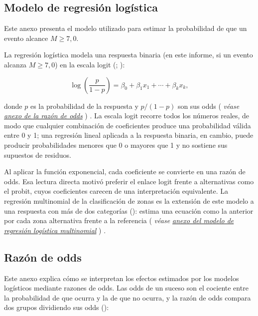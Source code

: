 \documentclass[
  spanish,
  letterpaper,
  DIV=11,
  numbers=noendperiod]{scrartcl}
\newcommand{\asesoriaParenRef}[1]{%
  \textnormal{\textcolor{asesoriaTextColor}{(}}%
  {\hypersetup{linkcolor=asesoriaLinkColor,urlcolor=asesoriaLinkColor,citecolor=asesoriaLinkColor}\textcolor{asesoriaTextColor}{\emph{#1}}}%
  \textnormal{\textcolor{asesoriaTextColor}{)}}%
}
\begin{document}
\subsection{Modelo de regresión logística}\label{sec-anexo-logistica}

Este anexo presenta el modelo utilizado para estimar la probabilidad de
que un evento alcance \(M \geq 7{,}0\).

La regresión logística modela una respuesta binaria (en este informe, si
un evento alcanza \(M \geq 7{,}0\)) en la escala logit
(;
):

\[
\log\!\left(\frac{p}{1-p}\right)=\beta_0+\beta_1 x_1+\cdots+\beta_k x_k,
\]

donde \(p\) es la probabilidad de la respuesta y \(p/(1-p)\) son sus
odds
\asesoriaParenRef{véase \hyperref[sec-anexo-or]{anexo de la razón de odds}}.
La escala logit recorre todos los números reales, de modo que cualquier
combinación de coeficientes produce una probabilidad válida entre 0 y 1;
una regresión lineal aplicada a la respuesta binaria, en cambio, puede
producir probabilidades menores que 0 o mayores que 1 y no sostiene sus
supuestos de residuos.

Al aplicar la función exponencial, cada coeficiente se convierte en una
razón de odds. Esa lectura directa motivó preferir el enlace logit
frente a alternativas como el probit, cuyos coeficientes carecen de una
interpretación equivalente. La regresión multinomial de la clasificación
de zonas es la extensión de este modelo a una respuesta con más de dos
categorías (): estima una ecuación como la anterior por cada zona alternativa
frente a la referencia
\asesoriaParenRef{véase \hyperref[sec-anexo-multinomial]{anexo del modelo de regresión logística multinomial}}.

\subsection{Razón de odds}\label{sec-anexo-or}

Este anexo explica cómo se interpretan los efectos estimados por los
modelos logísticos mediante razones de odds. Las odds de un suceso son
el cociente entre la probabilidad de que ocurra y la de que no ocurra, y
la razón de odds compara dos grupos dividiendo sus odds
():
\end{document}
